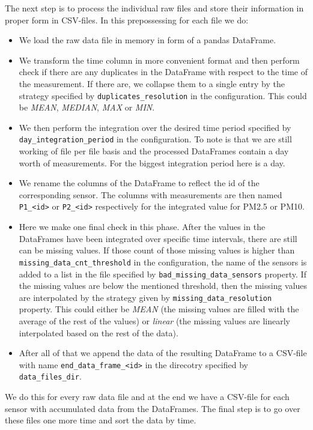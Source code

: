 \documentclass[12pt,a4paper,twoside]{scrartcl}
\numberwithin{equation}{section}
\begin{document}
The next step is to process the individual raw files and store their information in proper form in CSV-files. In this prepossessing for each file we do:
\begin{itemize}
\item We load the raw data file in memory in form of a pandas DataFrame.
\item We transform the time column in more convenient format and then perform check if there are any duplicates in the DataFrame with respect to the time of the measurement. If there are, we collapse them to a single entry by the strategy specified by \texttt{duplicates\_resolution} in the configuration. This could be \emph{MEAN}, \emph{MEDIAN}, \emph{MAX} or \emph{MIN}.
\item We then perform the integration over the desired time period specified by \texttt{day\_integration\_period} in the configuration. To note is that we are still working of file per file basis and the processed DataFrames contain a day worth of measurements. For the biggest integration period here is a day.
\item We rename the columns of the DataFrame to reflect the id of the corresponding sensor. The columns with measurements are then named \texttt{P1\_<id>} or \texttt{P2\_<id>} respectively for the integrated value for PM2.5 or PM10.
\item Here we make one final check in this phase. After the values in the DataFrames have been integrated over specific time intervals, there are still can be missing values. If those count of those missing values is higher than \texttt{missing\_data\_cnt\_threshold} in the configuration, the name of the sensors is added to a list in the file specified by \texttt{bad\_missing\_data\_sensors} property. If the missing values are below the mentioned threshold, then the missing values are interpolated by the strategy given by \texttt{missing\_data\_resolution} property. This could either be \emph{MEAN} (the missing values are filled with the average of the rest of the values) or \emph{linear} (the missing values are linearly interpolated based on the rest of the data).
\item After all of that we append the data of the resulting DataFrame to a CSV-file with name \texttt{end\_data\_frame\_<id>} in the direcotry specified by \texttt{data\_files\_dir}.
\end{itemize}
We do this for every raw data file and at the end we have a CSV-file for each sensor with accumulated data from the DataFrames. The final step is to go over these files one more time and sort the data by time.
\end{document}
